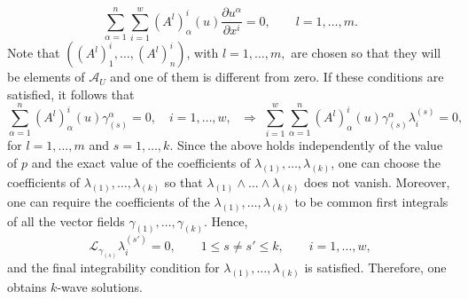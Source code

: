 \documentclass[12pt]{article}
\theoremstyle{plain}
\theoremstyle{definition}
\numberwithin{equation}{section}
\begin{document}
$$
\sum_{\alpha=1}^n\sum_{i=1}^w(A^l)^i_\alpha(u)\frac{\partial u^\alpha}{\partial x^i}=0,\qquad l=1,\ldots,m.
$$
Note that  $((A^l)^i_1,\ldots,(A^l)^i_n)$, with $l=1,\ldots,m,$ are chosen so that they will be elements of $\mathcal{A}_U$ and one of them is different from zero. If these conditions are satisfied, it follows that 
$$
\sum_{\alpha=1}^n(A^l)^i_\alpha(u)\gamma^\alpha_{(s)}=0,\quad i=1,\ldots,w,\,\,\,\,\Longrightarrow \,\,\sum_{i=1}^w\sum_{\alpha=1}^n(A^l)^i_{\alpha}(u)\gamma^\alpha_{(s)}\lambda^{(s)}_{i}=0,
$$
for $l=1,\ldots,m$ and $s=1,\ldots,k$. Since the above holds independently of the value of $p$ and the exact value of the coefficients of $\lambda_{(1)},\ldots,\lambda_{(k)}$, one can choose  the coefficients of $\lambda_{(1)},\ldots,\lambda_{(k)}$ so that $\lambda_{(1)}\wedge \ldots\wedge \lambda_{(k)}$ does not vanish. Moreover, one can require the coefficients of the $\lambda_{(1)},\ldots,\lambda_{(k)}$ to be common first integrals of all the vector fields $\gamma_{(1)},\ldots,\gamma_{(k)}$. Hence, 
$$
\mathcal{L}_{\gamma_{(s)}}\lambda^{(s')}_i=0,\qquad 1\leq s\neq s'\leq k,\qquad i=1,\ldots,w,
$$
and the final integrability condition for $\lambda_{(1)},\ldots,\lambda_{(k)}$ is satisfied. Therefore, 
one obtains $k$-wave solutions. 
\end{document}
